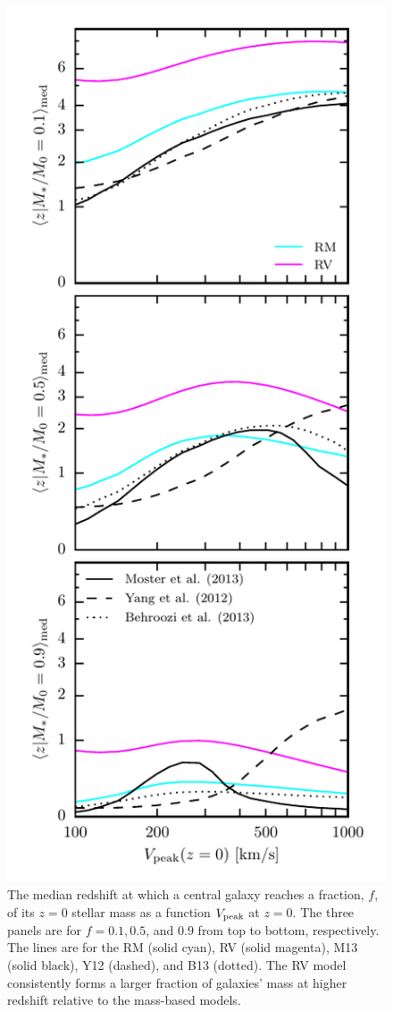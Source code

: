 \documentclass[a4paper,fleqn,usenatbib]{mnras}
\begin{document}
\begin{figure}
    \includegraphics{figures/stellar_mass_zform.pdf}
    \caption{The median redshift at which a central galaxy reaches a fraction, $f$, of its $z=0$ stellar mass as a function $V_{\rm peak}$ at $z=0$. The three panels are for $f=0.1, 0.5$, and $0.9$ from top to bottom, respectively.  The lines are for the RM (solid cyan), RV (solid magenta), M13 (solid black), Y12 (dashed), and B13 (dotted).  The RV model consistently forms a larger fraction of galaxies' mass at higher redshift relative to the mass-based models.}
    \label{fig:mstar_zform}
\end{figure}
\end{document}
